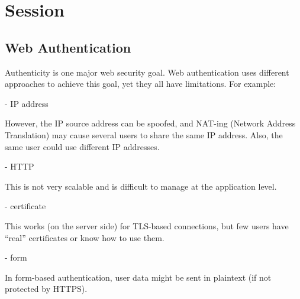 \section{Session}

\subsection{Web Authentication}
Authenticity is one major web security goal. Web authentication uses different approaches to achieve this goal, yet they all have limitations. For example:

- IP address

However, the IP source address can be spoofed, and NAT-ing (Network Address Translation) may cause several users to share the same IP address. Also, the same user could use different IP addresses. 

- HTTP

This is not very scalable and is difficult to manage at the application level.

- certificate

This works (on the server side) for TLS-based connections, but few users have ``real'' certificates or know how to use them. 

- form

In form-based authentication, user data might be sent in plaintext (if not protected by HTTPS).


